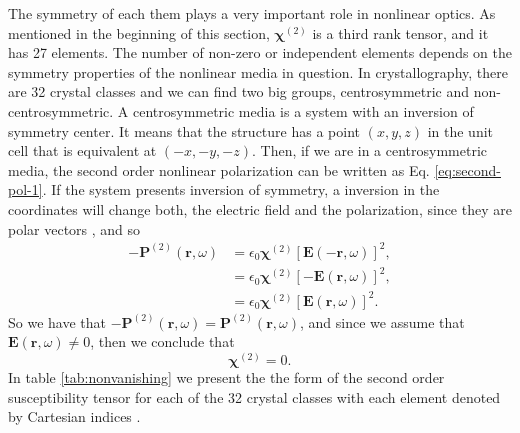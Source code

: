 The symmetry of each them plays a very important role in nonlinear optics. As
mentioned in the beginning of this section, $\boldsymbol{\chi}^{(2)}$ is a
third rank tensor, and it has 27 elements. The number of non-zero or
independent elements depends on the symmetry properties of the nonlinear media
in question. In crystallography, there are 32 crystal classes and we can find
two big groups, centrosymmetric and non-centrosymmetric. A centrosymmetric
media is a system with an inversion of symmetry center. It means that the
structure has a point $(x,y,z)$ in the unit cell that is equivalent at
$(-x,-y,-z)$. Then, if we are in a centrosymmetric media, the second order
nonlinear polarization can be written as Eq. \eqref{eq:second-pol-1}. If the
system presents inversion of symmetry, a inversion in the coordinates will
change both, the electric field and the polarization, since they are polar
vectors \cite{anderson16PHDT, jackson98book}, and so
\begin{equation}
\begin{aligned}
- \mathbf{P}^{(2)} (\mathbf{r},\omega) 
&= \epsilon_{0} \boldsymbol{\chi}^{(2)}[\mathbf{E}(-\mathbf{r},\omega)]^{2}
, \\
&= \epsilon_{0} \boldsymbol{\chi}^{(2)}[-\mathbf{E}(\mathbf{r},\omega)]^{2}
, \\
&= \epsilon_{0} \boldsymbol{\chi}^{(2)}[ \mathbf{E}(\mathbf{r},\omega)]^{2}
.
\end{aligned}
\end{equation}
So we have that $- \mathbf{P}^{(2)} (\mathbf{r},\omega) = \mathbf{P}^{(2)}
(\mathbf{r},\omega)$, and since we assume that $\mathbf{E} (\mathbf{r},\omega)
\neq 0$, then we conclude that
\begin{equation}
\boldsymbol{\chi}^{(2)} = 0
.
\end{equation}
In table \ref{tab:nonvanishing} we present the the form of the second order
susceptibility tensor for each of the 32 crystal classes with each element
denoted by Cartesian indices \cite{boyd03book}.

